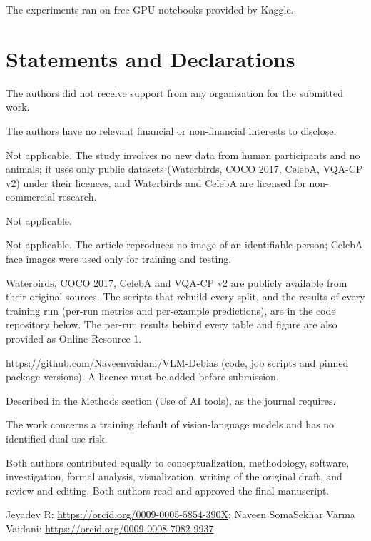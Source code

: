 \documentclass[pdflatex,sn-basic,iicol]{sn-jnl}
\theoremstyle{thmstyleone}
\theoremstyle{thmstyletwo}
\theoremstyle{thmstylethree}
\begin{document}
The experiments ran on free GPU notebooks provided by Kaggle.

\section*{Statements and Declarations}

The authors did not receive support from any organization for the submitted work.

The authors have no relevant financial or non-financial interests to disclose.

Not applicable. The study involves no new data from human participants and no animals; it uses only public datasets
(Waterbirds, COCO 2017, CelebA, VQA-CP v2) under their licences, and Waterbirds and CelebA are licensed for
non-commercial research.

Not applicable.

Not applicable. The article reproduces no image of an identifiable person; CelebA face images were used only for
training and testing.

Waterbirds, COCO 2017, CelebA and VQA-CP v2 are publicly available from their original sources. The scripts that
rebuild every split, and the results of every training run (per-run metrics and per-example predictions), are in the
code repository below. The per-run results behind every table and figure are also provided as Online Resource 1.

\url{https://github.com/Naveenvaidani/VLM-Debias} (code, job scripts and pinned package versions). A licence must be
added before submission.

Described in the Methods section (Use of AI tools), as the journal requires.

The work concerns a training default of vision-language models and has no identified dual-use risk.

Both authors contributed equally to conceptualization, methodology, software, investigation, formal analysis,
visualization, writing of the original draft, and review and editing. Both authors read and approved the final
manuscript.

Jeyadev R: \url{https://orcid.org/0009-0005-5854-390X}; Naveen SomaSekhar Varma Vaidani:
\url{https://orcid.org/0009-0008-7082-9937}.


\end{document}
